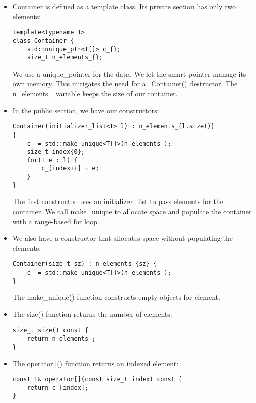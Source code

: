 \begin{itemize}
\item 
Container is defined as a template class. Its private section has only two elements:

\begin{lstlisting}[style=styleCXX]
template<typename T>
class Container {
	std::unique_ptr<T[]> c_{};
	size_t n_elements_{};
\end{lstlisting}

We use a unique\_pointer for the data. We let the smart pointer manage its own memory. This mitigates the need for a ~Container() destructor. The n\_elements\_ variable keeps the size of our container.

\item 
In the public section, we have our constructors:

\begin{lstlisting}[style=styleCXX]
Container(initializer_list<T> l) : n_elements_{l.size()}
{
	c_ = std::make_unique<T[]>(n_elements_);
	size_t index{0};
	for(T e : l) {
		c_[index++] = e;
	}
}
\end{lstlisting}

The first constructor uses an initializer\_list to pass elements for the container. We call make\_unique to allocate space and populate the container with a range-based for loop.

\item 
We also have a constructor that allocates space without populating the elements:

\begin{lstlisting}[style=styleCXX]
Container(size_t sz) : n_elements_{sz} {
	c_ = std::make_unique<T[]>(n_elements_);
}
\end{lstlisting}

The make\_unique() function constructs empty objects for element.

\item 
The size() function returns the number of elements:

\begin{lstlisting}[style=styleCXX]
size_t size() const {
	return n_elements_;
}
\end{lstlisting}

\item 
The operator[]() function returns an indexed element:

\begin{lstlisting}[style=styleCXX]
const T& operator[](const size_t index) const {
	return c_[index];
}
\end{lstlisting}


\end{itemize}
